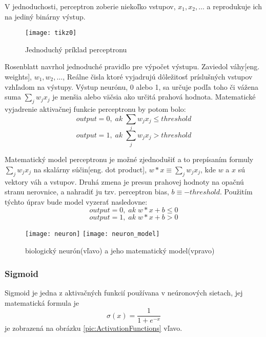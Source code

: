 V jednoduchosti, perceptron zoberie niekoľko vstupov, $x_1, x_2, \dots$ a reprodukuje ich na jediný binárny výstup.
\begin{figure}[H]
	\centering
	\texttt{[image: tikz0]}
	\caption{Jednoduchý príklad perceptronu\cite{odkaz:HandwrittenDigitRecognision}}
	\label{pic:NNExample}
\end{figure}
Rosenblatt navrhol jednoduché pravidlo pre výpočet výstupu.
Zaviedol váhy[eng. weights], $w_1, w_2, \dots$,
Reálne čisla ktoré vyjadrujú dôležitosť príslušných vstupov vzhľadom na výstupy.
Výstup neurónu, 0 alebo 1, sa určuje podľa toho či vážena suma $\sum_j w_j x_j$ je menšia alebo väčsia ako určitá prahová hodnota.
Matematické vyjadrenie aktivačnej funkcie perceptronu by potom bolo\cite{odkaz:HandwrittenDigitRecognision}:
\begin{equation}
    output = 0, \; ak \; \sum_j w_j x_j \leq threshold
\end{equation}
\begin{equation}
    output = 1, \; ak \; \sum_j w_j x_j > threshold
\end{equation}

Matematický model perceptronu je možné zjednodušiť a to prepísaním formuly $\sum_j w_j x_j$ na skalárny súčin[eng. dot product],
    $w*x \equiv \sum_j w_j x_j$, kde $w$ a $x$ sú vektory váh a vstupov.
Druhá zmena je presun prahovej hodnoty na opačnú stranu nerovnice, a nahradiť ju tzv. perceptron bias, $b \equiv -threshold$.
Použitím týchto úprav bude model vyzerať nasledovne\cite{odkaz:HandwrittenDigitRecognision}:
\begin{equation}
    output = 0, \; ak \; w*x + b \leq 0
\end{equation}
\begin{equation}
    output = 1, \; ak \; w*x + b > 0
\end{equation}

\begin{figure}[H]
    \centering
    \texttt{[image: neuron]}
    \qquad
    \texttt{[image: neuron\_model]}
    \caption{biologický neurón(vľavo) a jeho matematický model(vpravo)\cite{odkaz:ConvolutionalNeuralNetworkCS231n}}
    \label{pic:Neuron}
\end{figure}

\subsubsection{Sigmoid}
Sigmoid je jedna z aktivačných funkcií používana v neúronových sietach, jej matematická formula je
\begin{equation}
    \sigma(x) = \frac{1}{1 + e^{-x}}
\end{equation}
je zobrazená na obrázku \ref{pic:ActivationFunctions} vľavo.

